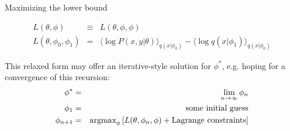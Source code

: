 \documentclass{beamer}
\begin{document}
\begin{frame}{Maximizing the lower bound}

\begin{eqnarray*}
L(\theta,\phi) & \equiv & L(\theta,\phi,\phi) \\
L(\theta,\phi_0,\phi_1) & = & \langle \log P(x,y|\theta) \rangle_{q(x|\phi_0)} - \langle \log q(x|\phi_1) \rangle_{q(x|\phi_0)}
\end{eqnarray*}

This relaxed form may offer an iterative-style solution for $\phi^\ast$,
e.g. hoping for a convergence of this recursion:
\begin{eqnarray*}
\phi^\ast & = & \lim_{n \to \infty} \phi_n \\
\phi_1 & = & \mbox{some initial guess} \\
\phi_{n+1} & = & {\mbox{argmax}}_{\phi} \left[ L(\theta,\phi_n,\phi) + \mbox{Lagrange constraints} \right]
\end{eqnarray*}

\end{frame}
\end{document}
